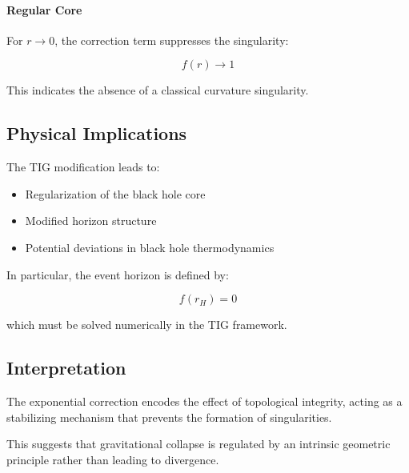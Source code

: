 \paragraph{Regular Core}

For $r \rightarrow 0$, the correction term suppresses the singularity:

\[
f(r) \rightarrow 1
\]

This indicates the absence of a classical curvature singularity.

\subsection{Physical Implications}

The TIG modification leads to:

\begin{itemize}
\item Regularization of the black hole core
\item Modified horizon structure
\item Potential deviations in black hole thermodynamics
\end{itemize}

In particular, the event horizon is defined by:

\[
f(r_H) = 0
\]

which must be solved numerically in the TIG framework.

\subsection{Interpretation}

The exponential correction encodes the effect of topological integrity, acting as a stabilizing mechanism that prevents the formation of singularities.

This suggests that gravitational collapse is regulated by an intrinsic geometric principle rather than leading to divergence.
